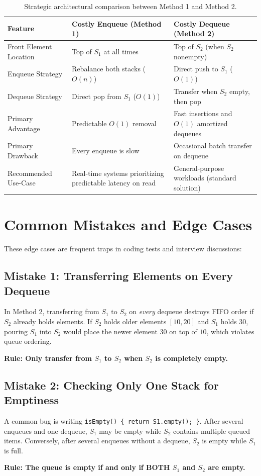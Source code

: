 \begin{table}[htbp]
\centering
\small
\begin{tabularx}{\textwidth}{l X X}
\toprule
\textbf{Feature} & \textbf{Costly Enqueue (Method 1)} & \textbf{Costly Dequeue (Method 2)} \\
\midrule
Front Element Location & Top of $S_1$ at all times & Top of $S_2$ (when $S_2$ nonempty) \\
Enqueue Strategy       & Rebalance both stacks ($O(n)$) & Direct push to $S_1$ ($O(1)$) \\
Dequeue Strategy       & Direct pop from $S_1$ ($O(1)$) & Transfer when $S_2$ empty, then pop \\
Primary Advantage      & Predictable $O(1)$ removal & Fast insertions and $O(1)$ amortized dequeues \\
Primary Drawback       & Every enqueue is slow & Occasional batch transfer on dequeue \\
Recommended Use-Case   & Real-time systems prioritizing predictable latency on read & General-purpose workloads (standard solution) \\
\bottomrule
\end{tabularx}
\caption{Strategic architectural comparison between Method 1 and Method 2.}
\end{table}

\section{Common Mistakes and Edge Cases}

These edge cases are frequent traps in coding tests and interview discussions:

\subsection{Mistake 1: Transferring Elements on Every Dequeue}
In Method 2, transferring from $S_1$ to $S_2$ on \emph{every} dequeue destroys FIFO order if $S_2$ already holds elements. If $S_2$ holds older elements $[10, 20]$ and $S_1$ holds $30$, pouring $S_1$ into $S_2$ would place the newer element $30$ on top of $10$, which violates queue ordering. 
\begin{center}
\textbf{Rule: Only transfer from $S_1$ to $S_2$ when $S_2$ is completely empty.}
\end{center}

\subsection{Mistake 2: Checking Only One Stack for Emptiness}
A common bug is writing \texttt{isEmpty() \{ return S1.empty(); \}}. After several enqueues and one dequeue, $S_1$ may be empty while $S_2$ contains multiple queued items. Conversely, after several enqueues without a dequeue, $S_2$ is empty while $S_1$ is full. 
\begin{center}
\textbf{Rule: The queue is empty if and only if BOTH $S_1$ and $S_2$ are empty.}
\end{center}

